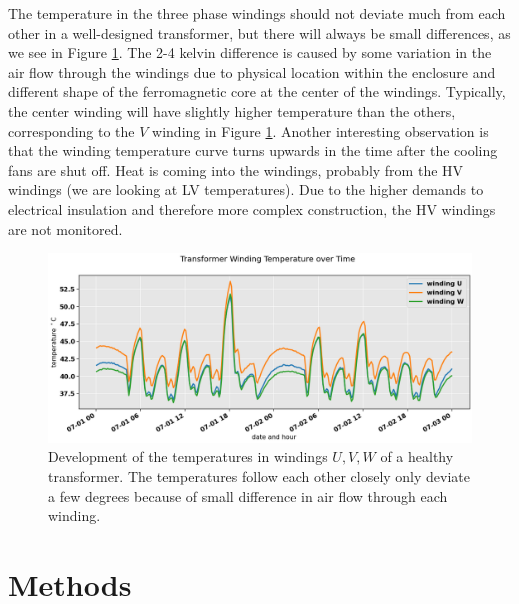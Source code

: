 \documentclass[]{article}
\begin{document}
The temperature in the three phase windings should not deviate much from each other in a well-designed transformer, but there will always be small differences, as we see in Figure \ref{fig:all-winding-temperature-over-time}. The 2-4 kelvin difference is caused by some variation in the air flow through the windings due to physical location within the enclosure and different shape of the ferromagnetic core at the center of the windings. Typically, the center winding will have slightly higher temperature than the others, corresponding to the $V$ winding in Figure \ref{fig:all-winding-temperature-over-time}. Another interesting observation is that the winding temperature curve turns upwards in the time after the cooling fans are shut off. Heat is coming into the windings, probably from the HV windings (we are looking at LV temperatures). Due to the higher demands to electrical insulation and therefore more complex construction, the HV windings are not monitored.

\begin{figure}[!h]
	\centering
	\includegraphics[width=1\linewidth]{./figs/all-winding-temperature-over-time.png}
	\caption{Development of the temperatures in windings $U,V,W$ of a healthy transformer. The temperatures follow each other closely only deviate a few degrees because of small difference in air flow through each winding.}
	\label{fig:all-winding-temperature-over-time}
\end{figure}





\section{Methods} \label{sec:methods}
\end{document}
